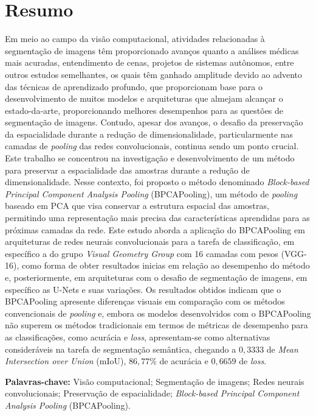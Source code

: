\section*{Resumo}
\thispagestyle{empty}
\makeatletter
\makeatother
Em meio ao campo da visão computacional, atividades relacionadas à segmentação de imagens têm proporcionado avanços quanto a análises médicas mais acuradas, entendimento de cenas, projetos de sistemas autônomos, entre outros estudos semelhantes, os quais têm ganhado amplitude devido ao advento das técnicas de aprendizado profundo, que proporcionam base para o desenvolvimento de muitos modelos e arquiteturas que almejam alcançar o estado-da-arte, proporcionando melhores desempenhos para as questões de segmentação de imagens.
Contudo, apesar dos avanços, o desafio da preservação da espacialidade durante a redução de dimensionalidade, particularmente nas camadas de \textit{pooling} das redes convolucionais, continua sendo um ponto crucial. Este trabalho se concentrou na investigação e desenvolvimento de um método para preservar a espacialidade das amostras durante a redução de dimensionalidade. Nesse contexto, foi proposto o método denominado \textit{Block-based Principal Component Analysis Pooling} (BPCAPooling), um método de \textit{pooling} baseado em PCA que visa conservar a estrutura espacial das amostras, permitindo uma representação mais precisa das características aprendidas para as próximas camadas da rede.
Este estudo aborda a aplicação do BPCAPooling em arquiteturas de redes neurais convolucionais para a tarefa de classificação, em específico a do grupo \textit{Visual Geometry Group} com 16 camadas com pesos (VGG-16), como forma de obter resultados inicias em relação ao desempenho do método e, posteriormente, em arquiteturas com o desafio de segmentação de imagens, em específico as U-Nets e suas variações. Os resultados obtidos indicam que o BPCAPooling apresente diferenças visuais em comparação com os métodos convencionais de \textit{pooling} e, embora os modelos desenvolvidos com o BPCAPooling não superem os métodos tradicionais em termos de métricas de desempenho para as classificações, como acurácia e \textit{loss}, apresentam-se como alternativas consideráveis na tarefa de segmentação semântica, chegando a $0,3333$ de \textit{Mean Intersection over Union} (mIoU), $86,77\%$ de acurácia e $0,6659$ de \textit{loss}.

\textbf{Palavras-chave:} Visão computacional; Segmentação de imagens; Redes neurais convolucionais; Preservação de espacialidade; \textit{Block-based Principal Component Analysis Pooling} (BPCAPooling).

